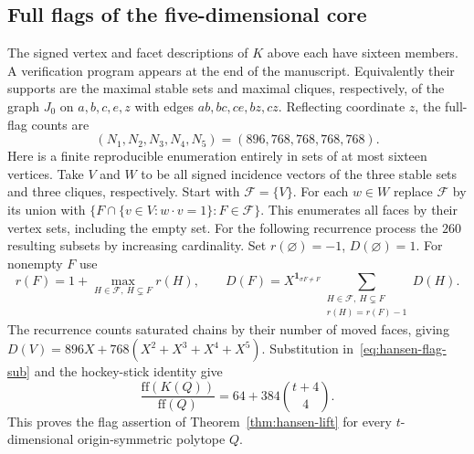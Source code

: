 \documentclass[11pt,a4paper]{article}
\numberwithin{equation}{section}
\begin{document}
\subsection{Full flags of the five-dimensional core}
The signed vertex and facet descriptions of $K$ above each have sixteen members. A verification program appears at the end of the manuscript. Equivalently their supports are the maximal stable sets and maximal cliques, respectively, of the graph $J_0$ on $a,b,c,e,z$ with edges $ab,bc,ce,bz,cz$. Reflecting coordinate $z$, the full-flag counts are
\[
 (N_1,N_2,N_3,N_4,N_5)=(896,768,768,768,768).
\]
Here is a finite reproducible enumeration entirely in sets of at most sixteen vertices. Take $V$ and $W$ to be all signed incidence vectors of the three stable sets and three cliques, respectively. Start with $\mathcal F=\{V\}$. For each $w\in W$ replace $\mathcal F$ by its union with $\{F\cap\{v\in V:w\cdot v=1\}:F\in\mathcal F\}$. This enumerates all faces by their vertex sets, including the empty set. For the following recurrence process the $260$ resulting subsets by increasing cardinality. Set $r(\varnothing)=-1$, $D(\varnothing)=1$. For nonempty $F$ use
\[
 r(F)=1+\max_{H\in\mathcal F,\ H\subsetneq F}r(H),\qquad
 D(F)=X^{\mathbf1_{\sigma F\ne F}}
 \sum_{\substack{H\in\mathcal F,\ H\subsetneq F\\r(H)=r(F)-1}} D(H).
\]
The recurrence counts saturated chains by their number of moved faces, giving $D(V)=896X+768(X^2+X^3+X^4+X^5)$. Substitution in~\eqref{eq:hansen-flag-sub} and the hockey-stick identity give
\[
 \frac{\mathrm{ff}(K(Q))}{\mathrm{ff}(Q)}
   =64+384\binom{t+4}{4}.
\]
This proves the flag assertion of Theorem~\ref{thm:hansen-lift} for every $t$-dimensional origin-symmetric polytope $Q$.
\end{document}
